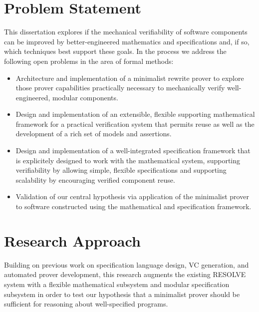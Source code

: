 \section{Problem Statement}
This dissertation explores if the mechanical verifiability of software components can be improved by better-engineered mathematics and specifications and, if so, which techniques best support these goals.  In the process we address the following open problems in the area of formal methods:

\begin{itemize}
\item Architecture and implementation of a minimalist rewrite prover to explore those prover capabilities practically necessary to mechanically verify well-engineered, modular components.
\item Design and implementation of an extensible, flexible supporting mathematical framework for a practical verification system that permits reuse as well as the development of a rich set of models and assertions.
\item Design and implementation of a well-integrated specification framework that is explicitely designed to work with the mathematical system, supporting verifiability by allowing simple, flexible specifications and supporting scalability by encouraging verified component reuse.
\item Validation of our central hypothesis via application of the minimalist prover to software constructed using the mathematical and specification framework.
\end{itemize}

\section{Research Approach}
Building on previous work on specification language design, VC generation, and automated prover development, this research augments the existing RESOLVE\cite{sitariman1994component,Sit11} system with a flexible mathematical subsystem and modular specification subsystem in order to test our hypothesis that a minimalist prover should be sufficient for reasoning about well-specified programs.


